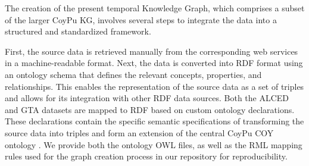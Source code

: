 The creation of the present temporal Knowledge Graph, which comprises a subset of the larger CoyPu KG, involves several steps to integrate the data into a structured and standardized framework. 

First, the source data is retrieved manually from the corresponding web services in a machine-readable format. Next, the data is converted into RDF format using an ontology schema that defines the relevant concepts, properties, and relationships. This enables the representation of the source data as a set of triples and allows for its integration with other RDF data sources. 
Both the ALCED and GTA datasets are mapped to RDF based on custom ontology declarations. These declarations contain the specific semantic specifications of transforming the source data into triples and form an extension of the central CoyPu COY ontology \cite{coy_2023}. 
We provide both the ontology OWL files, as well as the RML mapping rules used for the graph creation process in our repository for reproducibility.

